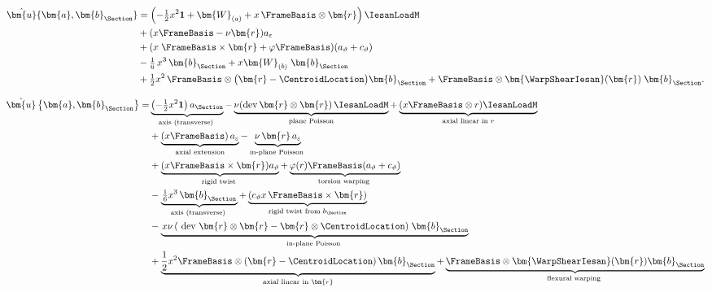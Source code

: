 \begin{equation}
\begin{aligned}
  \hat{\bm{u}}\{\bm{a},\bm{b}_{\Section}\}
    &= 
      \left(-\tfrac{1}{2}x^2 \mathbf{1} +\bm{W}_{(a)} + x\, \FrameBasis\otimes\bm{r}\right)\IesanLoadM \\ 
    &+ (x\FrameBasis - \nu \bm{r})a_{\varepsilon} \\
    &+(x\; \FrameBasis\times \bm{r} + \varphi \FrameBasis) (a_{\vartheta} + c_{\vartheta})\\
    &-\tfrac{1}{6}\,x^3\,\bm{b}_{\Section}
      + x \bm{W}_{(b)}\;\bm{b}_{\Section} \\
    &+\tfrac{1}{2}x^2\,\FrameBasis\otimes\big(\bm{r} -\CentroidLocation\big)\bm{b}_{\Section}
    + \FrameBasis\otimes\bm{\WarpShearIesan}(\bm{r})\;\bm{b}_{\Section} .
\end{aligned}
\end{equation}
\begin{Details}
\[
\begin{aligned} \hat{\bm{u}}\left\{\bm{a}, \bm{b}_{\Section}\right\}= 
& \underbrace{\left(-\tfrac{1}{2} x^2 \mathbf{1}\right) a_{\Section}}_{\text {axis (transverse) }}
-\underbrace{\nu (\operatorname{dev} \bm{r} \otimes \bm{r})\, \IesanLoadM}_{\text {plane Poisson}}
+\underbrace{(x \FrameBasis \otimes r) \IesanLoadM}_{\text {axial linear in } r} \\ 
& +\underbrace{(x \FrameBasis)\, a_{\varepsilon}}_{\text {axial extension}}
-\underbrace{\nu \,\bm{r}\, a_{\varepsilon}}_{\text {in-plane Poisson }} \\ 
& +\underbrace{(x \FrameBasis \times \bm{r}) a_{\vartheta}}_{\text {rigid twist }}
+\underbrace{\varphi(r) \FrameBasis (a_{\vartheta} + c_{\vartheta})}_{\text {torsion warping }} \\ 
& -\underbrace{\left.\tfrac{1}{6} x^3 \,\bm{b}_{\Section}\right.}_{\text {axis (transverse) }}
+\underbrace{\left(c_{\vartheta} x\, \FrameBasis \times \bm{r}\right)}_{\text {rigid twist from } b_{\Section}} \\ 
& -\underbrace{\left. x \nu\left(\text { dev } \bm{r}\otimes\bm{r} - \bm{r} \otimes \CentroidLocation\right)\right. \bm{b}_{\Section}}_{\text {in-plane Poisson }} \\ 
& +\underbrace{\frac{1}{2} x^2 \FrameBasis \otimes\left(\bm{r}-\CentroidLocation\right) \bm{b}_{\Section}}_{\text {axial linear in } \bm{r}}
+\underbrace{\FrameBasis \otimes \bm{\WarpShearIesan}(\bm{r}) \bm{b}_{\Section}}_{\text {flexural warping }}
\end{aligned}
\]
\end{Details}

